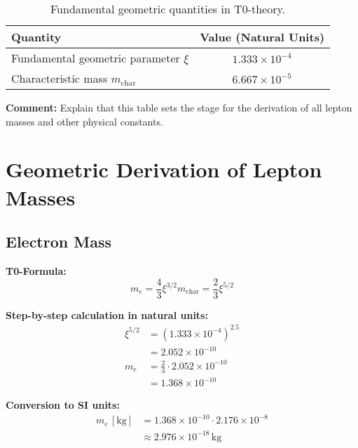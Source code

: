 \documentclass[12pt,a4paper]{article}
\newcommand{\xipar}{\xi}            %
\newcommand{\mchar}{m_{\text{char}}} %
\begin{document}
\begin{table}[H]
	\centering
	\begin{tabular}{@{}lc@{}}
		\toprule
		Quantity & Value (Natural Units) \\ \midrule
		Fundamental geometric parameter $\xipar$ & $1.333 \times 10^{-4}$ \\
		Characteristic mass $\mchar$ & $6.667 \times 10^{-5}$ \\
		\bottomrule
	\end{tabular}
	\caption{Fundamental geometric quantities in T0-theory.}
\end{table}

\textbf{Comment:} Explain that this table sets the stage for the derivation of all lepton masses and other physical constants.

\section{Geometric Derivation of Lepton Masses}

\subsection{Electron Mass}

\textbf{T0-Formula:}
\begin{equation}
	m_e = \frac{4}{3} \xipar^{3/2} \mchar = \frac{2}{3} \xipar^{5/2}
\end{equation}

\textbf{Step-by-step calculation in natural units:}
\begin{align}
	\xipar^{5/2} &= (1.333 \times 10^{-4})^{2.5} \\
	&= 2.052 \times 10^{-10} \\
	m_e &= \frac{2}{3} \cdot 2.052 \times 10^{-10} \\
	&= 1.368 \times 10^{-10}
\end{align}

\textbf{Conversion to SI units:}
\begin{align}
	m_e \,[\text{kg}] &= 1.368 \times 10^{-10} \cdot 2.176 \times 10^{-8} \\
	&\approx 2.976 \times 10^{-18}\,\text{kg}
\end{align}
\end{document}
